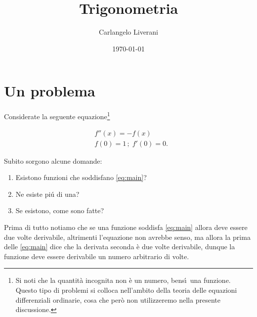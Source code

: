 \documentclass{amsart}
\numberwithin{equation}{section}
\begin{document}
\title{{\huge Trigonometria}}
\author{Carlangelo Liverani}
\address{Dipartimento di Matematica\\
Universit\`{a} di Roma (Tor Vergata)\\
Via della Ricerca Scientifica, 00133 Roma, Italy\\
{\tt liverani@mat.uniroma2.it}}
\date{\today}
\maketitle


\section{Un problema}\label{sec:zero}
Considerate la seguente equazione\footnote{Si noti che la quantit\`a incognita non \`e un numero, bens\'\i\ una funzione. Questo tipo di problemi si colloca nell'ambito della teoria delle equazioni differenziali ordinarie, cosa che per\`o non utilizzeremo nella presente discussione.}

\begin{equation}\label{eq:main}
\begin{split}
&f''(x)=-f(x)\\
&f(0)=1\,;\;f'(0)=0.
\end{split}
\end{equation}

Subito sorgono alcune domande:
\begin{enumerate}
\item Esistono funzioni che soddisfano \eqref{eq:main}?
\item Ne esiste pi\'u di una?
\item Se esistono, come sono fatte?
\end{enumerate}

Prima di tutto notiamo che se una funzione soddisfa \eqref{eq:main} allora deve essere due volte derivabile, altrimenti l'equazione non avrebbe senso, ma allora la prima delle \eqref{eq:main} dice che la derivata seconda \`e due volte derivabile, dunque la funzione deve essere derivabile un numero arbitrario di volte.
\end{document}
